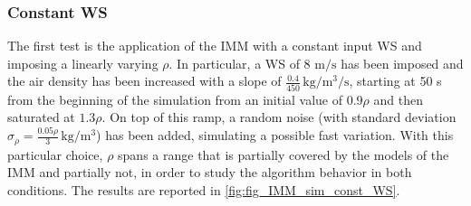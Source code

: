 \subsubsection{Constant WS} 
The first test is the application of the IMM with a constant input WS and imposing a linearly varying $\rho$. In particular, a WS of 8 $\si{\meter\per\second}$ has been imposed and the air density has been increased with a slope of $\frac{0.4}{450} \, \si{\kilo\gram\per\cubic\meter\per\second}$, starting at 50 s from the beginning of the simulation from an initial value of $0.9\rho$ and then saturated at $1.3\rho$. On top of this ramp, a random noise (with standard deviation $\sigma_{\rho}=\frac{0.05\rho}{3} \, \si{\kilo\gram\per\cubic\meter}$) has been added, simulating a possible fast variation. With this particular choice, $\rho$ spans a range that is partially covered by the models of the IMM and partially not, in order to study the algorithm behavior in both conditions. The results are reported in \autoref{fig:fig_IMM_sim_const_WS}.

